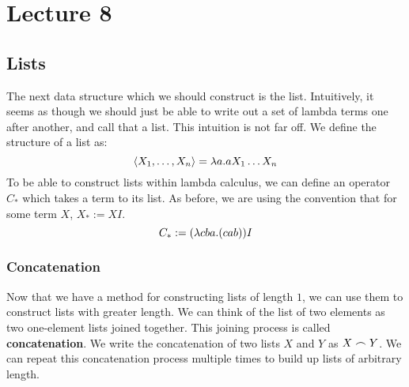 \chapter{Lecture 8}
\pagestyle{fancy}

\section{Lists}
The next data structure which we should construct is the list. Intuitively, it seems as though we should just be able to write out a set of lambda terms one after another, and call that a list. This intuition is not far off. We define the structure of a list as:
\begin{equation*}
  \langle X_1,\ldots,X_n\rangle = \lambda a. aX_1\ldots X_n
\end{equation*}
To be able to construct lists within lambda calculus, we can define an operator $C_*$ which takes a term to its list. As before, we are using the convention that for some term $X$, $X_* := XI$.
\begin{equation*}
  C_* := (\lambda cba.(cab))I
\end{equation*}


\subsection{Concatenation}
Now that we have a method for constructing lists of length $1$, we can use them to construct lists with greater length. We can think of the list of two elements as two one-element lists joined together. This joining process is called \textbf{concatenation}. We write the concatenation of two lists $X$ and $Y$ as $X \frown Y$. We can repeat this concatenation process multiple times to build up lists of arbitrary length.\\

